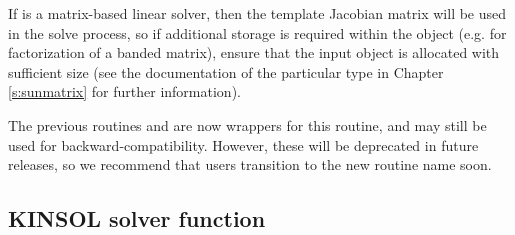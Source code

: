 {
  If  is a matrix-based linear solver, then the template
  Jacobian matrix  will be used in the solve process, so if
  additional storage is required within the {\sunmatrix} object
  (e.g. for factorization of a banded matrix), ensure that the input
  object is allocated with sufficient size (see the documentation of
  the particular {\sunmatrix} type in Chapter \ref{s:sunmatrix} for
  further information).

  The previous routines  and
   are now wrappers for this routine, and may
  still be used for backward-compatibility.  However, these will be
  deprecated in future releases, so we recommend that users transition
  to the new routine name soon.
}

\subsection{KINSOL solver function}\label{sss:kinsol}

